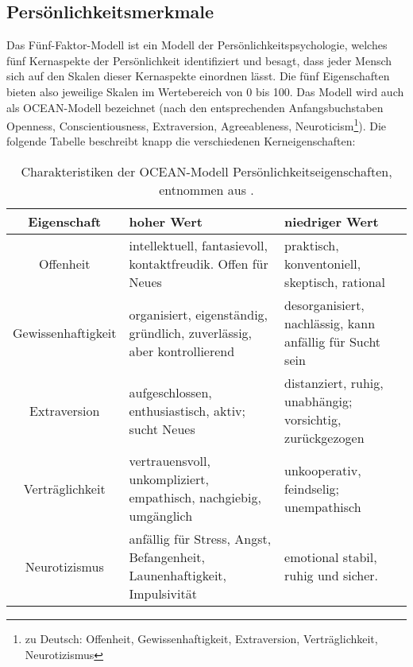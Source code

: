 \subsection{Persönlichkeitsmerkmale}

Das Fünf-Faktor-Modell ist ein Modell der Persönlichkeitspsychologie, welches fünf Kernaspekte der Persönlichkeit identifiziert und besagt, dass jeder Mensch sich auf den Skalen dieser Kernaspekte einordnen lässt.
Die fünf Eigenschaften bieten also jeweilige Skalen im Wertebereich von 0 bis 100.
Das Modell wird auch als OCEAN-Modell bezeichnet (nach den entsprechenden Anfangsbuchstaben Openness, Conscientiousness, Extraversion, Agreeableness, Neuroticism\footnote{zu Deutsch: Offenheit, Gewissenhaftigkeit, Extraversion, Verträglichkeit, Neurotizismus}).
Die folgende Tabelle beschreibt knapp die verschiedenen Kerneigenschaften:

\begin{table}[!htp]
    \centering
    \begin{tabular}{ |c|m{11em}|m{11em}| }
        \hline
        \textbf{Eigenschaft} & \textbf{hoher Wert}                                                      & \textbf{niedriger Wert}                                   \\
        \hline \hline
        Offenheit            & intellektuell, fantasievoll, kontaktfreudik. Offen für Neues             & praktisch, konventoniell, skeptisch, rational             \\
        \hline
        Gewissenhaftigkeit   & organisiert, eigenständig, gründlich, zuverlässig, aber kontrollierend   & desorganisiert, nachlässig, kann anfällig für Sucht sein  \\
        \hline
        Extraversion         & aufgeschlossen, enthusiastisch, aktiv; sucht Neues                       & distanziert, ruhig, unabhängig; vorsichtig, zurückgezogen \\
        \hline
        Verträglichkeit      & vertrauensvoll, unkompliziert, empathisch, nachgiebig, umgänglich        & unkooperativ, feindselig; unempathisch                    \\
        \hline
        Neurotizismus        & anfällig für Stress, Angst, Befangenheit, Launenhaftigkeit, Impulsivität & emotional stabil, ruhig und sicher.                       \\
        \hline
    \end{tabular}
    \caption{Charakteristiken der OCEAN-Modell Persönlichkeitseigenschaften, entnommen aus .}
\end{table}
\FloatBarrier

